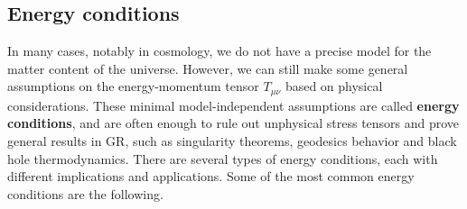 \documentclass[../geometry_main.tex]{subfiles}
\begin{document}
\subsection{Energy conditions}

In many cases, notably in cosmology, we do not have a precise model for the matter content of the universe.
However, we can still make some general assumptions on the energy-momentum tensor $T_{\mu\nu}$ based on physical considerations.
These minimal model-independent assumptions are called \textbf{energy conditions}, and are often enough to rule out unphysical stress tensors and prove general results in GR, such as singularity theorems, geodesics behavior and black hole thermodynamics.
There are several types of energy conditions, each with different implications and applications.
Some of the most common energy conditions are the following.
\end{document}
